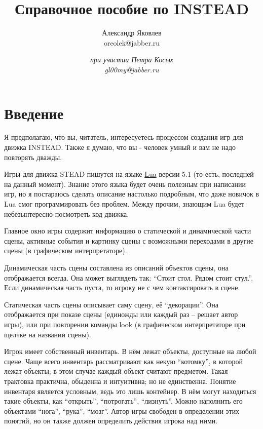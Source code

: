 \documentclass[a4paper,12pt]{article}
\begin{document}
\title{Справочное пособие по INSTEAD}
\author{Александр Яковлев\\oreolek@jabber.ru \and \textit{при участии Петра Косых}\\\textit{gl00my@jabber.ru}}
\maketitle
\tableofcontents
\clearpage
\section*{Введение}
Я предполагаю, что вы, читатель, интересуетесь процессом создания игр для движка INSTEAD. Также я думаю, что вы - человек умный и вам не надо повторять дважды.

Игры для движка STEAD пишутся на языке \href{http://www.lua.org}{Lua} версии 5.1 (то есть, последней на данный момент). Знание этого языка будет очень полезным при написании игр, но я постараюсь сделать описание настолько подробным, что даже новичок в Lua смог программировать без проблем. Между прочим, знающим Lua будет небезынтересно посмотреть код движка.

Главное окно игры содержит информацию о статической и динамической части сцены, активные события и картинку сцены с возможными переходами в другие сцены (в графическом интерпретаторе).

Динамическая часть сцены составлена из описаний объектов сцены, она отображается всегда. Она может выглядеть так: ``Стоит стол. Рядом стоит стул.''. Если динамическая часть пуста, то игроку не с чем контактировать в сцене.

Статическая часть сцены описывает саму сцену, её ``декорации''. Она отображается при показе сцены (единожды или каждый раз -- решает автор игры), или при повторении команды look (в графическом интерпретаторе при щелчке на названии сцены).

Игрок имеет собственный инвентарь. В нём лежат объекты, доступные на любой сцене. Чаще всего инвентарь рассматривают как некую ``котомку'', в которой лежат объекты; в этом случае каждый объект считают предметом. Такая трактовка практична, обыденна и интуитивна; но не единственна. Понятие инвентаря является условным, ведь это лишь контейнер. В нём могут находиться такие объекты, как ``открыть'', ``потрогать'', ``лизнуть''. Можно наполнить его объектами ``нога'', ``рука'', ``мозг''. Автор игры свободен в определении этих понятий, но он также должен определить действия игрока над ними.
\end{document}
